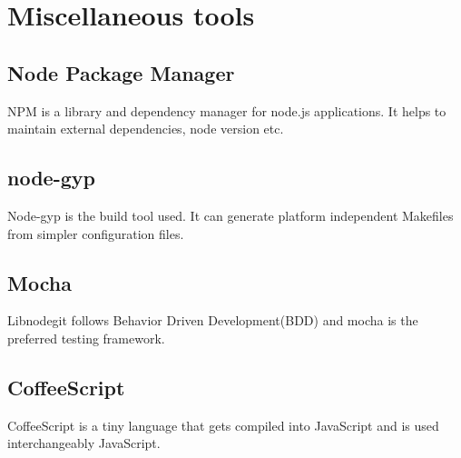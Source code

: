 \section{Miscellaneous tools}

\subsection{Node Package Manager}
NPM is a library and dependency manager for node.js applications. It helps to
maintain external dependencies, node version etc.

\subsection{node-gyp}
Node-gyp is the build tool used. It can generate platform independent Makefiles
from simpler configuration files.

\subsection{Mocha}
Libnodegit follows Behavior Driven Development(BDD) and mocha is the preferred
testing framework.

\subsection{CoffeeScript}
CoffeeScript is a tiny language that gets compiled into JavaScript and is used
interchangeably JavaScript.
